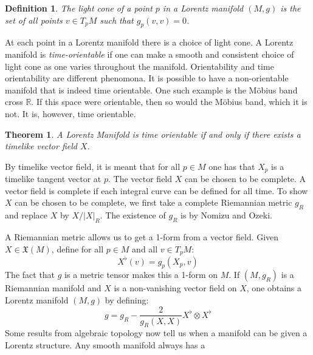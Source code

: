 \documentclass{article}
\theoremstyle{plain}
\newtheorem{theorem}{Theorem}[section]
\theoremstyle{thmit}
\theoremstyle{normal}
\newtheorem{definition}{Definition}[section]
\begin{document}
        \begin{definition}
            The light cone of a point $p$ in a Lorentz manifold $(M,g)$ is the
            set of all points $v\in{T}_{p}M$ such that $g_{p}(v,v)=0$.
        \end{definition}
        At each point in a Lorentz manifold there is a choice of light cone. A
        Lorentz manifold is \textit{time-orientable} if one can make a smooth
        and consistent choice of light cone as one varies throughout the
        manifold. Orientability and time orientability are different
        phenomona. It is possible to have a non-orientable manifold that is
        indeed time orientable. One such example is the M\"{o}bius band cross
        $\mathbb{R}$. If this space were orientable, then so would the
        M\"{o}bius band, which it is not. It is, however, time orientable.
        \begin{theorem}
            A Lorentz Manifold is time orientable if and only if there exists
            a timelike vector field $X$.
        \end{theorem}
        By timelike vector field, it is meant that for all $p\in{M}$ one has
        that $X_{p}$ is a timelike tangent vector at $p$. The vector field $X$
        can be chosen to be complete. A vector field is complete if each
        integral curve can be defined for all time. To show $X$ can be chosen to
        be complete, we first take a complete Riemannian metric $g_{R}$ and
        replace $X$ by $X/|X|_{R}$. The existence of $g_{R}$ is by
        Nomizu and Ozeki.
        \par\hfill\par
        A Riemannian metric allows us to get a 1-form from a vector field.
        Given $X\in\mathfrak{X}(M)$, define for all $p\in{M}$ and all
        $v\in{T}_{p}M$:
        \begin{equation}
            X^{\flat}(v)=g_{p}(X_{p},v)
        \end{equation}
        The fact that $g$ is a metric tensor makes this a 1-form on $M$. If
        $(M,g_{R})$ is a Riemannian manifold and $X$ is a non-vanishing vector
        field on $X$, one obtains a Lorentz manifold $(M,g)$ by defining:
        \begin{equation}
            g=g_{R}-\frac{2}{g_{R}(X,X)}X^{\flat}\otimes{X}^{\flat}
        \end{equation}
        Some results from algebraic topology now tell us when a manifold can be
        given a Lorentz structure. Any smooth manifold always has a
\end{document}
